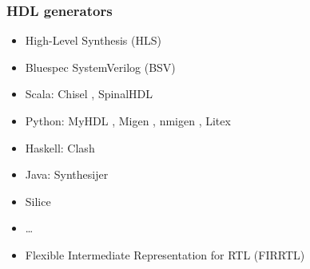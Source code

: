 \documentclass{beamer}
\begin{document}
\begin{frame}
\frametitle{HDL generators}
\begin{itemize}
\item High-Level Synthesis (HLS)
\href{https://en.wikipedia.org/wiki/High-level_synthesis}{\faWikipediaW}

\item Bluespec SystemVerilog (BSV) \href{https://bluespec.com/}{\faGlobe}
\href{https://github.com/bluespec}{\faGithub} \href{https://github.com/B-Lang-org/bsc}{\faGit}

\item Scala:
Chisel
\href{https://www.chisel-lang.org/}{\faGlobe} \href{https://github.com/freechipsproject/chisel3}{\faGithub},
SpinalHDL
\href{https://github.com/SpinalHDL}{\faGithub} \href{https://spinalhdl.github.io/SpinalDoc-RTD/}{\faBook}

\item Python:
MyHDL
\href{http://www.myhdl.org/}{\faGlobe} \href{https://github.com/myhdl/myhdl}{\faGithub},
Migen
\href{https://m-labs.hk/gateware/migen/}{\faGlobe}
\href{https://github.com/m-labs?type=source}{\faGithub},
nmigen
\href{https://nmigen.info/nmigen}{\faGlobe}
\href{https://github.com/nmigen/nmigen}{\faGithub},
Litex
\href{https://github.com/enjoy-digital/litex}{\faGithub}

\item Haskell:
Clash
\href{https://clash-lang.org/}{\faGlobe}
\href{https://github.com/clash-lang}{\faGithub}

\item Java:
Synthesijer
\href{https://github.com/synthesijer/synthesijer}{\faGithub}
\href{https://synthesijer.github.io/web/}{\faBook}

\item
Silice
\href{https://github.com/sylefeb/Silice}{\faGithub}

\item \ldots
\end{itemize}

\vfill

\begin{itemize}
\item Flexible Intermediate Representation for RTL (FIRRTL)
\href{https://github.com/freechipsproject/firrtl}{\faGithub}
\href{https://freechipsproject.github.io/firrtl/}{\faBook}
\end{itemize}
\end{frame}
\end{document}
